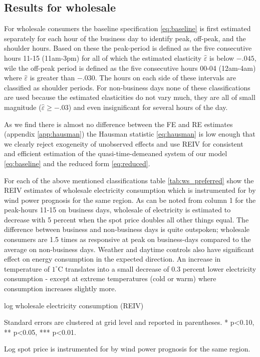 \label{sec:results}
\subsection{Results for wholesale}
\label{subsec:r_wholesale}
For wholesale consumers the baseline specification \eqref{eq:baseline} is first estimated separately for each hour of the business day to identify peak, off-peak, and the shoulder hours. Based on these the peak-period is defined as the five consecutive hours 11-15 (11am-3pm) for all of which the estimated elasticity $\widehat{\varepsilon}$ is below $-.045$, wile the off-peak period is defined as the five consecutive hours 00-04 (12am-4am) where $\widehat{\varepsilon}$ is greater than $-.030$. The hours on each side of these intervals are classified as shoulder periods. For non-business days none of these classifications are used because the estimated elasticities do not vary much, they are all of small magnitude ($\widehat{\varepsilon}\geq-.03$)  and even insignificant for several hours of the day.
\bigskip\par
As we find there is almost no difference between the FE and RE estimates (appendix \ref{app:hausman}) the Hausman statistic \eqref{eq:hausman} is low enough that we clearly reject exogeneity of unobserved effects and use REIV for consistent and efficient estimation of the quasi-time-demeaned system of our model \eqref{eq:baseline} and the reduced form \eqref{eq:reduced}.
\bigskip\par
For each of the above mentioned classifications table \ref{tab:ws_preferred} show the REIV estimates of wholesale electricity consumption which is instrumented for by wind power prognosis for the same region. As can be noted from column 1 for the peak-hours 11-15 on business days, wholesale of electricity is estimated to decrease with 5 percent when the spot price doubles all other things equal. The difference between business and non-business days is quite outspoken; wholesale consumers are 1.5 times as responsive at peak on business-days compared to the average on non-business days. Weather and daytime controls also have significant effect on energy consumption in the expected direction. An increase in temperature of  $1^{\circ}$C translates into a small decrease of 0.3 percent lower electricity consumption - except at extreme temperatures (cold or warm) where consumption increases slightly more.
\begin{table}[H]
\begin{threeparttable}
  \centering
  \caption{log wholesale electricity consumption (REIV)}
  \footnotesize
        
    \begin{tablenotes}
    \item Standard errors are clustered at grid level and reported in parentheses. * p<0.10, ** p<0.05, *** p<0.01.
    \item Log spot price is instrumented for by wind power prognosis for the same region.
     \end{tablenotes}
  \label{tab:ws_preferred}
\end{threeparttable}
\end{table}
\noindent

